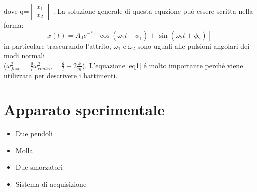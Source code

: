 \documentclass{exam}
\begin{document}
		dove q=$
		\begin{bmatrix}
			x_1 \\
			x_2
		\end{bmatrix}$
		. La soluzione generale di questa equzione pu\'o essere scritta nella forma:
		\begin{equation}
			\label{eq1}
			x(t)= A_0 e^{-\frac{t}{\tau}}[\cos(\omega_1 t + \phi_1) +\sin(\omega_2 t + \phi_2) ]
		\end{equation}
		in particolare trascurando l'attrito, $\omega_1$ e $\omega_2$ sono uguali alle pulsioni angolari dei modi normali\\($\omega_{fase}^2=\frac{g}{l} \omega_{contro}^2=\frac{g}{l}+2\frac{k}{m} $). L'equazione \ref{eq1} \'e molto importante perch\'e viene utilizzata per descrivere i battimenti.

	\section{Apparato sperimentale}
		\begin{itemize}
			\item Due pendoli
			\item Molla
			\item Due smorzatori
			\item Sistema di acquisizione
		\end{itemize}
\end{document}
